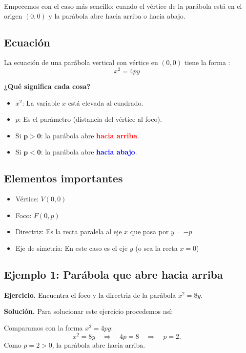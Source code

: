 \documentclass[12pt,a4paper]{article}
\begin{document}
	Empecemos con el caso más sencillo: cuando el vértice de la parábola está en el origen \((0,0)\) y la parábola abre hacia arriba o hacia abajo.

	\subsection*{Ecuación}

	La ecuación de una parábola vertical con vértice en \((0,0)\) tiene la forma :
	\[
	\boxed{x^2=4py}
	\]

	\textbf{¿Qué significa cada cosa?}
	\begin{itemize}
		\item \(x^2\): La variable \(x\) está elevada al cuadrado.
		\item \(p\): Es el parámetro (distancia del vértice al foco).
		\item Si \(\mathbf{p>0}\): la parábola abre \textcolor{red}{\textbf{hacia arriba}}.
		\item Si \(\mathbf{p<0}\): la parábola abre \textcolor{blue}{\textbf{hacia abajo}}.
	\end{itemize}

	\subsection*{Elementos importantes}
	\begin{itemize}
		\item Vértice: \(V(0,0)\)
		\item Foco: \(F(0,p)\)
		\item Directriz: Es la recta paralela al eje $x$ que pasa por \(y=-p\)
		\item Eje de simetría: En este caso es el eje \(y\) (o sea la recta \(x=0\))
	\end{itemize}

	\subsection*{Ejemplo 1: Parábola que abre hacia arriba}

	\textbf{Ejercicio.} Encuentra el foco y la directriz de la parábola \(x^2=8y\).

	\bigskip

	\textbf{Solución.} Para solucionar este ejercicio procedemos así:
	
	\bigskip
	
	Comparamos con la forma \(x^2=4py\):
	\[
	x^2=8y \quad\Rightarrow\quad 4p=8 \quad\Rightarrow\quad p=2.
	\]
	Como \(p=2>0\), la parábola abre hacia arriba.
\end{document}
